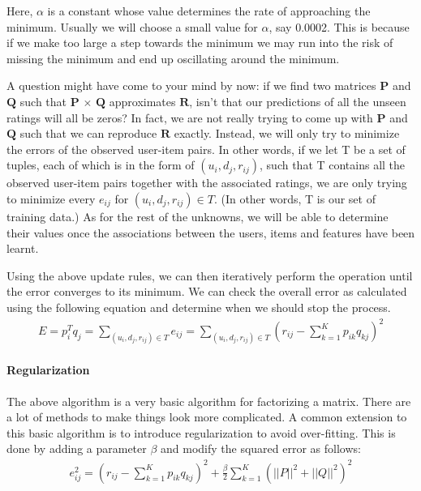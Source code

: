  Here, $\alpha$ is a constant whose value determines the rate of approaching the minimum. Usually we will choose a small value for $\alpha$, say 0.0002. This is because if we make too large a step towards the minimum we may run into the risk of missing the minimum and end up oscillating around the minimum.

 A question might have come to your mind by now: if we find two matrices $\mathbf{P}$ and $\mathbf{Q}$ such that $\mathbf{P}$ $\times$ $\mathbf{Q}$ approximates $\mathbf{R}$, isn’t that our predictions of all the unseen ratings will all be zeros? In fact, we are not really trying to come up with $\mathbf{P}$ and $\mathbf{Q}$ such that we can reproduce $\mathbf{R}$ exactly. Instead, we will only try to minimize the errors of the observed user-item pairs. In other words, if we let T be a set of tuples, each of which is in the form of $(u_i, d_j, r_{ij})$, such that T contains all the observed user-item pairs together with the associated ratings, we are only trying to minimize every $e_{ij}$ for $(u_i, d_j, r_{ij}) \in T$. (In other words, T is our set of training data.) As for the rest of the unknowns, we will be able to determine their values once the associations between the users, items and features have been learnt.

 Using the above update rules, we can then iteratively perform the operation until the error converges to its minimum. We can check the overall error as calculated using the following equation and determine when we should stop the process.
  \begin{gather*}
    E = p_i^{T}q_j = \sum_{(u_i,d_j,r_{ij})\in T} e_{ij} = \sum_{(u_i,d_j,r_{ij})\in T} (r_{ij} - \sum_{k=1}^{K}p_{ik}q_{kj})^2
  \end{gather*}
\paragraph{Regularization}

 The above algorithm is a very basic algorithm for factorizing a matrix. There are a lot of methods to make things look more complicated. A common extension to this basic algorithm is to introduce regularization to avoid over-fitting. This is done by adding a parameter $\beta$ and modify the squared error as follows:
  \begin{gather*}
    e_{ij}^2 = (r_{ij} - \sum_{k=1}^{K}p_{ik}q_{kj})^2 + \frac{\beta}{2}\sum_{k=1}^{K}(||P||^2 + ||Q||^2)^2
  \end{gather*}

